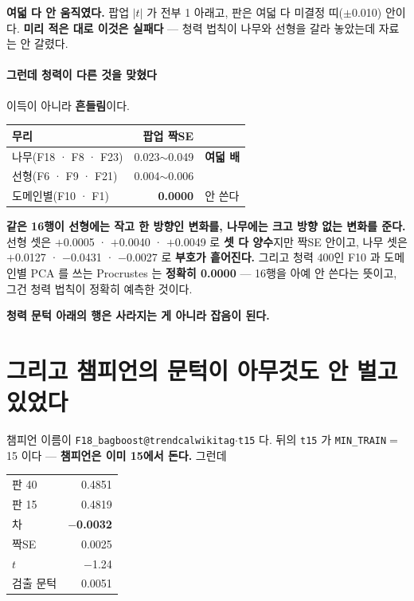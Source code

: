 \documentclass[10pt]{article}
\begin{document}
\textbf{여덟 다 안 움직였다.} 팝업 $|t|$ 가 전부 1 아래고, 판은 여덟 다
미결정 띠($\pm$0.010) 안이다. \textbf{미리 적은 대로 이것은 실패다} ---
청력 법칙이 나무와 선형을 갈라 놓았는데 자료는 안 갈렸다.

\paragraph{그런데 청력이 다른 것을 맞혔다} 이득이 아니라 \textbf{흔들림}이다.

\begin{center}\footnotesize
\begin{tabular}{lrl}
\hline
무리 & 팝업 짝SE & \\
\hline
나무(F18 · F8 · F23) & 0.023$\sim$0.049 & \textbf{여덟 배} \\
선형(F6 · F9 · F21) & 0.004$\sim$0.006 & \\
도메인별(F10 · F1) & \textbf{0.0000} & 안 쓴다 \\
\hline
\end{tabular}
\end{center}

\textbf{같은 16행이 선형에는 작고 한 방향인 변화를, 나무에는 크고 방향 없는
변화를 준다.} 선형 셋은 $+$0.0005 · $+$0.0040 · $+$0.0049 로 \textbf{셋 다
양수}지만 짝SE 안이고, 나무 셋은 $+$0.0127 · $-$0.0431 · $-$0.0027 로
\textbf{부호가 흩어진다.} 그리고 청력 400인 F10 과 도메인별 PCA 를 쓰는
Procrustes 는 \textbf{정확히 0.0000} --- 16행을 아예 안 쓴다는 뜻이고,
그건 청력 법칙이 정확히 예측한 것이다.

\textbf{청력 문턱 아래의 행은 사라지는 게 아니라 잡음이 된다.}

\section{그리고 챔피언의 문턱이 아무것도 안 벌고 있었다}

챔피언 이름이 \texttt{F18\_bagboost@trendcalwikitag$\cdot$t15} 다. 뒤의
\texttt{t15} 가 \texttt{MIN\_TRAIN}${=}$15 이다 --- \textbf{챔피언은 이미
15에서 돈다.} 그런데

\begin{center}\small
\begin{tabular}{lr}
\hline
판 40 & 0.4851 \\
판 15 & 0.4819 \\
\hline
차 & \textbf{$-$0.0032} \\
짝SE & 0.0025 \\
$t$ & $-$1.24 \\
검출 문턱 & 0.0051 \\
\hline
\end{tabular}
\end{center}
\end{document}
